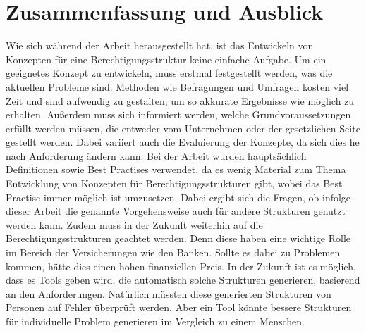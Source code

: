 \section{Zusammenfassung und Ausblick}
\label{sec:chapter06:Ausblick}
Wie sich während der Arbeit herausgestellt hat, ist das Entwickeln von Konzepten für eine Berechtigungsstruktur keine einfache Aufgabe.
Um ein geeignetes Konzept zu entwickeln, muss erstmal festgestellt werden, was die aktuellen Probleme sind.
Methoden wie Befragungen und Umfragen kosten viel Zeit und sind aufwendig zu gestalten, um so akkurate Ergebnisse wie möglich zu erhalten.
Außerdem muss sich informiert werden, welche Grundvoraussetzungen erfüllt werden müssen, die entweder vom Unternehmen oder der gesetzlichen Seite gestellt werden.
Dabei variiert auch die Evaluierung der Konzepte, da sich dies he nach Anforderung ändern kann.
\newline
Bei der Arbeit wurden hauptsächlich Definitionen sowie Best Practises verwendet, da es wenig Material zum Thema Entwicklung von Konzepten für Berechtigungsstrukturen gibt, wobei das Best Practise immer möglich ist umzusetzen.
Dabei ergibt sich die Fragen, ob infolge dieser Arbeit die genannte Vorgehensweise auch für andere Strukturen genutzt werden kann.
\newline
Zudem muss in der Zukunft weiterhin auf die Berechtigungsstrukturen geachtet werden.
Denn diese haben eine wichtige Rolle im Bereich der Versicherungen wie den Banken.
Sollte es dabei zu Problemen kommen, hätte dies einen hohen finanziellen Preis.
In der Zukunft ist es möglich, dass es Tools geben wird, die automatisch solche Strukturen generieren, basierend an den Anforderungen.
Natürlich müssten diese generierten Strukturen von Personen auf Fehler überprüft werden. Aber ein Tool könnte bessere Strukturen für individuelle Problem generieren im Vergleich zu einem Menschen.